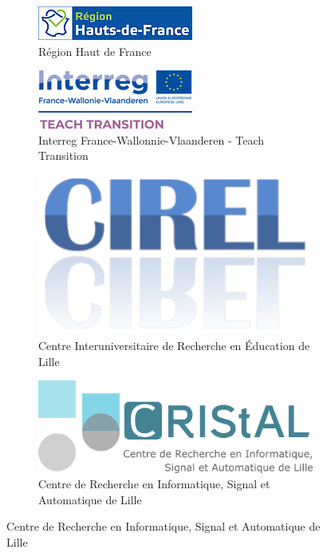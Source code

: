 \begin{figure}[!ht]
	\begin{subfigure}{0.4\textwidth}
		\includegraphics[width=\textwidth]{Content/figures/regionHautDeFrance.jpg}
		\caption{Région Haut de France}
	\end{subfigure}
	\hfill
	\begin{subfigure}{0.4\textwidth}
		\includegraphics[width=\textwidth]{Content/figures/interreg.png}
		\caption{Interreg France-Wallonnie-Vlaanderen - Teach Transition}
	\end{subfigure}
	
	\vspace{0.08\textheight}
	
	\begin{subfigure}{0.4\textwidth}
		\includegraphics[width=\textwidth]{Content/figures/cirel.png}
		\caption{Centre Interuniversitaire de Recherche en Éducation de Lille}
	\end{subfigure}
	\hfill
	\begin{subfigure}{0.4\textwidth}
		\includegraphics[width=\textwidth]{Content/figures/cristal.png}
		\caption{Centre de Recherche en Informatique, Signal et Automatique de Lille}
	\end{subfigure}
\end{figure}

\pageblanche %